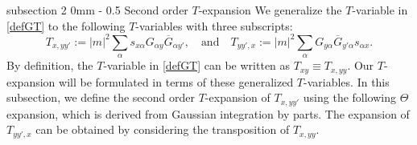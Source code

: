 \documentclass{article}
\makeatletter
\newcommand{\1}{\mathds{1}}
\numberwithin{equation}{section}
\newcommand{\al}{\alpha}
\newcommand{\be}{\begin{equation}}
\newcommand{\ee}{\end{equation}}
\theoremstyle{plain} %
\theoremstyle{remark}
\renewcommand{\subsection}{\@startsection
{subsection}%
{2}%
{0mm}%
{-\baselineskip}%
{0.5\baselineskip}%
{\normalfont\bf\itshape}} %
\makeatother
\begin{document}
\subsection{Second order $T$-expansion} \label{sec Thetaexp} 
 We generalize  the $T$-variable in \eqref{defGT} to the following $T$-variables with three subscripts: 
 \be\label{general_T}
T_{x,yy'}:=|m|^2\sum_\al s_{x\al}G_{\al y}\overline G_{\al y'},\quad \text{and}\quad T_{yy',x}:=|m|^2\sum_\al G_{ y\al }\overline G_{y' \al}s_{\al x}. 
\ee
By definition,  the $T$-variable in \eqref{defGT} can be written as $T_{xy}\equiv T_{x,yy}$.
Our $T$-expansion will be formulated in terms of these generalized $T$-variables. In this subsection, we define the second order $T$-expansion of $T_{x,yy'}$ using the following $\Theta$ expansion, which is derived from Gaussian integration by parts. The expansion of $T_{yy',x}$ can be obtained by considering the transposition of $T_{x,yy}$.  %
\end{document}
